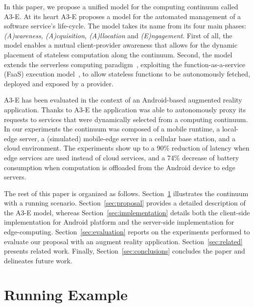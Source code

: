 In this paper, we propose a unified model for the computing continuum called A3-E. At its heart A3-E proposes a model for the automated management of a software service's life-cycle. The model takes its name from its four main phases: \textit{(A)wareness, (A)cquisition, (A)llocation} and \textit{(E)ngagement}. First of all, the model enables a mutual client-provider awareness that allows for the dynamic placement of stateless computation along the continuum. Second, the model extends the serverless computing paradigm~\cite{Hendrickson:2016,baldini2017serverless,GarrigaMendonca2017}, exploiting the function-as-a-service (FaaS) execution model~\cite{MateosFaaster17}, to allow stateless functions to be autonomously fetched, deployed and exposed by a provider. 

A3-E has been evaluated in the context of an Android-based augmented reality application. Thanks to A3-E the application was able to autonomously proxy its requests to services that were dynamically selected from a computing continuum. In our experiments the continuum was composed of a mobile runtime, a local-edge server, a (simulated) mobile-edge server in a cellular base station, and a cloud environment. The experiments show up to a 90\% reduction of latency when edge services are used instead of cloud services, and a 74\% decrease of battery consumption when computation is offloaded from the Android device to edge servers. 

The rest of this paper is organized as follows.  Section~\ref{sec:example} illustrates the continuum with a running scenario. Section~\ref{sec:proposal} provides a detailed description of the A3-E model, whereas Section~\ref{sec:implementation} details both the client-side implementation for Android platform and the server-side implementation for edge-computing. Section~\ref{sec:evaluation} reports on the experiments performed to evaluate our proposal with an augment reality application. Section~\ref{sec:related} presents related work. Finally, Section~\ref{sec:conclusions} concludes the paper and delineates future work.

\section{Running Example}
\label{sec:example}

